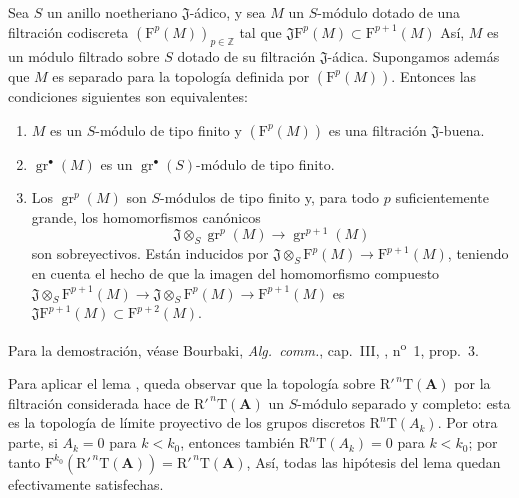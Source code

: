 \begin{lemma}[13.7.7.2]
\label{0.13.7.7.2}
\label{0.13.7.7.2-fr}
Sea $S$ un anillo noetheriano $\mathfrak J$-ádico, y sea $M$
un $S$-módulo dotado de una filtración codiscreta
$(\mathrm F^p(M))_{p\in\mathbb Z}$ tal que
$\mathfrak J\mathrm F^p(M)\subset\mathrm F^{p+1}(M)$
Así, $M$ es un módulo filtrado sobre $S$ dotado de su
filtración $\mathfrak J$-ádica.
Supongamos además que $M$ es separado para la topología definida por
$(\mathrm F^p(M))$.
Entonces las condiciones siguientes son equivalentes:
\begin{enumerate}
  \item[{\rm a)}] $M$ es un $S$-módulo de tipo finito y
  $(\mathrm F^p(M))$ es una filtración $\mathfrak J$-buena.
  \item[{\rm b)}] $\operatorname{gr}^\bullet(M)$ es un
  $\operatorname{gr}^\bullet(S)$-módulo de tipo finito.
  \item[{\rm c)}] Los $\operatorname{gr}^p(M)$ son $S$-módulos de
  tipo finito y, para todo $p$ suficientemente grande, los homomorfismos
  canónicos
  \begin{equation}
\label{0.13.7.7.3-fr}
\tag{13.7.7.3}
\mathfrak J\otimes_S\operatorname{gr}^p(M)\longrightarrow
\operatorname{gr}^{p+1}(M)
\end{equation}
  son sobreyectivos.
  Están inducidos por
  $\mathfrak J\otimes_S\mathrm F^p(M)\to\mathrm F^{p+1}(M)$, teniendo en cuenta el hecho
  de que la imagen del homomorfismo compuesto
  $\mathfrak J\otimes_S\mathrm F^{p+1}(M)\to
\mathfrak J\otimes_S\mathrm F^p(M)\to\mathrm F^{p+1}(M)$
  es
  $\mathfrak J\mathrm F^{p+1}(M)\subset\mathrm F^{p+2}(M)$.
\end{enumerate}

\textup{Para la demostración, véase Bourbaki, \emph{Alg.\ comm.}, cap.~III,
, n\textsuperscript{o}~1, prop.~3.}
\end{lemma}

\begin{env}[13.7.7.4]
\label{0.13.7.7.4}
\label{0.13.7.7.4-fr}
Para aplicar el lema , queda observar que la
topología sobre $\mathrm R'^{\,n}\mathrm T(\mathbf A)$ por la filtración considerada hace de $\mathrm R'^{\,n}\mathrm T(\mathbf A)$ un $S$-módulo separado y completo:
esta es la topología de límite proyectivo de los grupos discretos
$\mathrm R^n\mathrm T(A_k)$.
Por otra parte, si $A_k=0$ para $k<k_0$, entonces también
$\mathrm R^n\mathrm T(A_k)=0$ para $k<k_0$; por tanto
$\mathrm F^{k_0}(\mathrm R'^{\,n}\mathrm T(\mathbf A))=
\mathrm R'^{\,n}\mathrm T(\mathbf A)$,
Así, todas las hipótesis del lema quedan efectivamente satisfechas.
\end{env}

